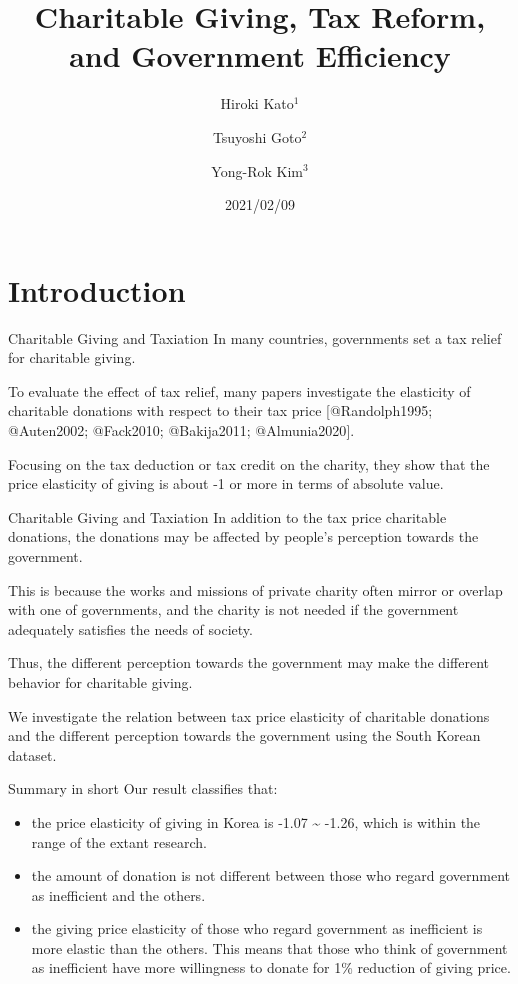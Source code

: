 \documentclass[
  ignorenonframetext,
]{beamer}
\title{Charitable Giving, Tax Reform, and Government Efficiency}
\author{ Hiroki Kato\(^1\)\and Tsuyoshi Goto\(^2\)\and Yong-Rok Kim\(^3\)}
\institute{\(^1\)Osaka University\and\(^2\)Chiba University\and\(^3\)Kobe University}
\date{2021/02/09}
\providecommand{\tightlist}{%
  \setlength{\itemsep}{0pt}\setlength{\parskip}{0pt}}
\begin{document}
\frame{\titlepage}

\begin{frame}
\end{frame}

\hypertarget{introduction}{%
\section{Introduction}\label{introduction}}

\begin{frame}{Charitable Giving and Taxiation}
\protect\hypertarget{charitable-giving-and-taxiation}{}
In many countries, governments set a tax relief for charitable giving.

To evaluate the effect of tax relief, many papers investigate the elasticity of charitable donations with respect to their tax price {[}@Randolph1995; @Auten2002; @Fack2010; @Bakija2011; @Almunia2020{]}.

Focusing on the tax deduction or tax credit on the charity, they show that the price elasticity of giving is about -1 or more in terms of absolute value.
\end{frame}

\begin{frame}{Charitable Giving and Taxiation}
\protect\hypertarget{charitable-giving-and-taxiation-1}{}
In addition to the tax price charitable donations, the donations may be affected by people's perception towards the government.

This is because the works and missions of private charity often mirror or overlap with one of governments, and the charity is not needed if the government adequately satisfies the needs of society.

Thus, the different perception towards the government may make the different behavior for charitable giving.

We investigate the relation between tax price elasticity of charitable donations and the different perception towards the government using the South Korean dataset.
\end{frame}

\begin{frame}{Summary in short}
\protect\hypertarget{summary-in-short}{}
Our result classifies that:

\begin{itemize}
\tightlist
\item
  the price elasticity of giving in Korea is -1.07 \textasciitilde{} -1.26, which is within the range of the extant research.
\item
  the amount of donation is not different between those who regard government as inefficient and the others.
\item
  the giving price elasticity of those who regard government as inefficient is more elastic than the others. This means that those who think of government as inefficient have more willingness to donate for 1\% reduction of giving price.
\end{itemize}
\end{frame}
\end{document}
